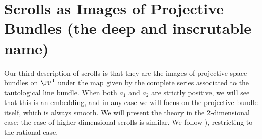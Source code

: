 \section{Scrolls as Images of Projective Bundles (the deep and inscrutable name)}\label{inscrutable name}

Our third description of scrolls is that they are the images of projective space bundles on $\PP^{1}$ under the map given by the complete series associated to the tautological line bundle. When both $a_{1}$ and $a_{2}$ are strictly positive, we will see that this is an embedding, and in any case we will focus on the projective bundle itself, which is always smooth. We will present the theory in the 2-dimensional case; the case of higher dimensional scrolls is similar. We follow  \cite[Chapter V]{Hartshorne1977}), restricting
to the rational case. 

